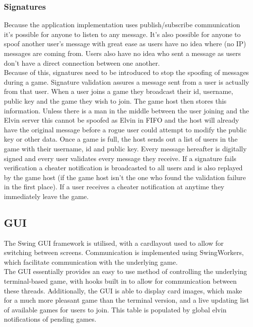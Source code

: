 \documentclass[11pt, oneside]{article}   	%
\begin{document}
\subsubsection{Signatures}

Because the application implementation uses publish/subscribe communication it’s possible for anyone to listen to any message. It’s also possible for anyone to spoof another user's message with great ease as users have no idea where (no IP) messages are coming from. Users also have no idea who sent a message as users don’t have a direct connection between one another.\\

Because of this, signatures need to be introduced to stop the spoofing of messages during a game. Signature validation assures a message sent from a user is actually from that user. When a user joins a game they broadcast their id, username, public key and the game they wish to join. The game host then stores this information. Unless there is a man in the middle between the user joining and the Elvin server this cannot be spoofed as Elvin in FIFO and the host will already have the original message before a rogue user could attempt to modify the public key or other data. Once a game is full, the host sends out a list of users in the game with their username, id and public key. Every message hereafter is digitally signed and every user validates every message they receive. If a signature fails verification a cheater notification is broadcasted to all users and is also replayed by the game host (if the game host isn't the one who found the validation failure in the first place). If a user receives a cheater notification at anytime they immediately leave the game.

\subsection{GUI}



The Swing GUI framework is utilised, with a cardlayout used to allow for switching between screens. Communication is implemented using SwingWorkers, which facilitate communication with the underlying game.\\

The GUI essentially provides an easy to use method of controlling the underlying terminal-based game, with hooks built in to allow for communication between these threads. Additionally, the GUI is able to display card images, which make for a much more pleasant game than the terminal version, and a live updating list of available games for users to join. This table is populated by global elvin notifications of pending games.
\end{document}
